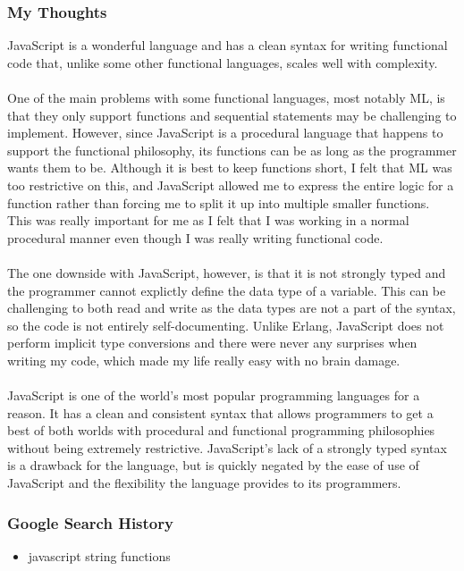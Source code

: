 \documentclass[letterpaper, 10pt, DIV=13]{scrartcl}
\numberwithin{equation}{section}
\numberwithin{figure}{section}
\numberwithin{table}{section}
\begin{document}
\subsubsection{My Thoughts}
JavaScript is a wonderful language and has a clean syntax for writing functional code that, unlike some other functional languages,
scales well with complexity.
\\ \\
One of the main problems with some functional languages, most notably ML, is that they only support functions and sequential statements
may be challenging to implement. However, since JavaScript is a procedural language that happens to support the functional philosophy,
its functions can be as long as the programmer wants them to be. Although it is best to keep functions short, I felt that ML was
too restrictive on this, and JavaScript allowed me to express the entire logic for a function rather than forcing me to split it up
into multiple smaller functions. This was really important for me as I felt that I was working in a normal procedural manner even
though I was really writing functional code.
\\ \\
The one downside with JavaScript, however, is that it is not strongly typed and the programmer cannot explictly define the data type
of a variable. This can be challenging to both read and write as the data types are not a part of the syntax, so the code is not entirely
self-documenting. Unlike Erlang, JavaScript does not perform implicit type conversions and there were never any surprises when writing my code,
which made my life really easy with no brain damage.
\\ \\
JavaScript is one of the world's most popular programming languages for a reason. It has a clean and consistent syntax that allows programmers
to get a best of both worlds with procedural and functional programming philosophies without being extremely restrictive. JavaScript's lack of
a strongly typed syntax is a drawback for the language, but is quickly negated by the ease of use of JavaScript and the flexibility the
language provides to its programmers.

\subsubsection{Google Search History}
\begin{itemize}
    \item javascript string functions
\end{itemize}
\end{document}
